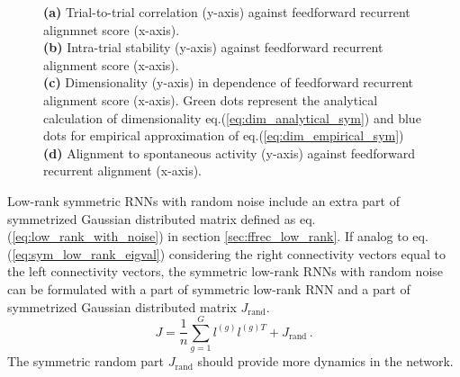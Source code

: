 \documentclass[11pt]{article}
\begin{document}
\begin{figure}[H]
{		\textbf{(a)} Trial-to-trial correlation (y-axis) against feedforward recurrent alignmnet score (x-axis).\\
		\textbf{(b)} Intra-trial stability (y-axis) against feedforward recurrent alignment score (x-axis). \\
		\textbf{(c)} Dimensionality (y-axis) in dependence of feedforward recurrent alignment score (x-axis). Green dots represent the analytical calculation of dimensionality eq.(\ref{eq:dim_analytical_sym}) and blue dots for empirical approximation of eq.(\ref{eq:dim_empirical_sym})\\
		 \textbf{(d)} Alignment to spontaneous activity (y-axis) against feedforward recurrent alignment (x-axis).}
	 	\label{fig:result_sym_low_rank_with_noise}
		\end{figure}
	
	Low-rank symmetric RNNs with random noise include an extra part of symmetrized Gaussian distributed matrix defined as  eq.(\ref{eq:low_rank_with_noise}) in section \ref{sec:ffrec_low_rank}. If analog to eq.(\ref{eq:sym_low_rank_eigval}) considering the right connectivity vectors equal to the left connectivity vectors, the symmetric low-rank RNNs with random noise can be formulated with a part of symmetric low-rank RNN and a part of symmetrized Gaussian distributed matrix $J_{\text{rand}}$. 
	\begin{equation} \label{eq:low_rank_sym_with_noise}
		J = \frac{1}{n}\sum_{g =1}^{G} l^{(g)} l^{(g)T} + J_{\text{rand}} \, .
	\end{equation}
	The symmetric random part $J_{\text{rand}}$ should provide more dynamics in the network. 
	
\end{document}
